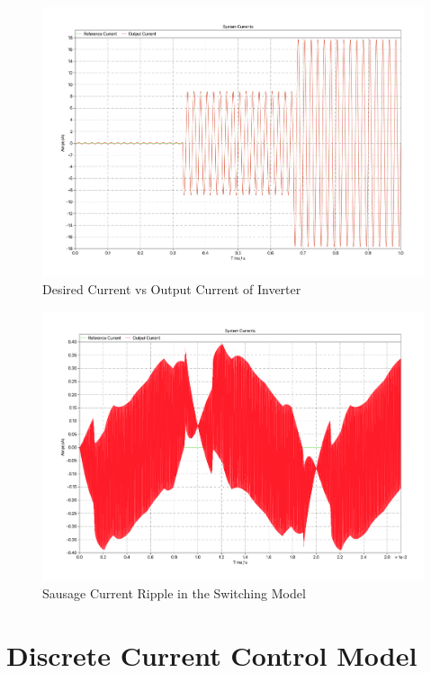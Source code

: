 \documentclass[12pt]{article}
\begin{document}
\begin{figure}[ht]
    \centering{}
    \includegraphics[width=\textwidth, height=0.4\textheight, keepaspectratio]{img/Average Time C Current.pdf}
    \caption{Desired Current vs Output Current of Inverter}
    \label{fig:switching-c-current}
\end{figure}

\begin{figure}[ht]
    \centering{}
    \includegraphics[width=\textwidth, height=0.4\textheight, keepaspectratio]{img/Switching C Current Ripple.pdf}
    \caption{Sausage Current Ripple in the Switching Model}
    \label{fig:switching-c-current-ripple}
\end{figure}

\section{Discrete Current Control Model}
\end{document}
